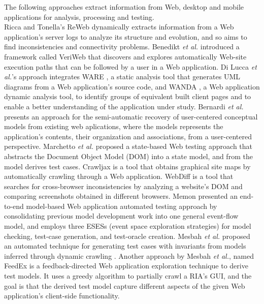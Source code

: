 The following approaches extract information from Web, desktop and mobile applications for analysis, processing and testing.\\
Ricca and Tonella's ReWeb \cite{ricca2001understanding} dynamically extracts information from a Web application's server logs to analyze its structure and evolution, and so aims to find inconsistencies and connectivity problems.
Benedikt \textit{et al.} introduced a framework called VeriWeb \cite{benedikt2002veriWeb} that discovers and explores automatically Web-site execution paths that can be followed by a user in a Web application.
Di Lucca \textit{et al.}'s approach \cite{di2005integrating} integrates WARE \cite{di2004reverse}, a static analysis tool that generates UML diagrams from a Web application's source code, and WANDA \cite{antoniol2004understanding}, a Web application dynamic analysis tool, to identify groups of equivalent built client pages and to enable a better understanding of the application under study.
Bernardi \textit{et al.} \cite{bernardi2008reverse} presents an approach for the semi-automatic recovery of user-centered conceptual models from existing web aplications, where the models represents the application's contents, their organization and associations, from a user-centered perspective.
Marchetto \textit{et al.} proposed a state-based Web testing approach \cite{marchetto2008state} that abstracts the Document Object Model (DOM) into a state model, and from the model derives test cases.
Crawljax \cite{roest2010automated} is a tool that obtains graphical site maps by automatically crawling through a Web application.
WebDiff \cite{choudhary2010Webdiff} is a tool that searches for cross-browser inconsistencies by analyzing a website's DOM and comparing screenshots obtained in different browsers.
Memon presented an end-to-end model-based Web application automated testing approach \cite{memon2007event} by consolidating previous model development work into one general event-flow model, and employs three ESESs (event space exploration strategies) for model checking, test-case generation, and test-oracle creation.
Mesbah \textit{et al.} proposed an automated technique for generating test cases with invariants from models inferred through dynamic crawling \cite{mesbah2012invariant}. Another approach by Mesbah \textit{et al.}, named FeedEx \cite{fard2013feedback} is a feedback-directed Web application exploration technique to derive test models. It uses a greedy algorithm to partially crawl a RIA's GUI, and the goal is that the derived test model capture different aspects of the given Web application's client-side functionality. 
